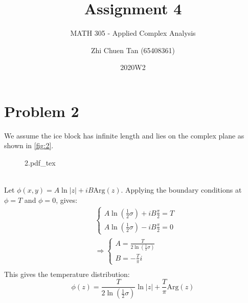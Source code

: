 \documentclass[a4paper, titlepage, DIV=14]{scrartcl}
\title{Assignment 4}
\subtitle{MATH 305 - Applied Complex Analysis}
\author{Zhi Chuen Tan (65408361)}
\date{2020W2}
\newcommand{\incfig}[1]{%
    \def\svgwidth{0.75\columnwidth}
    {#1.pdf_tex}
}
\newcommand{\Arg}{\text{Arg}}
\begin{document}
    \onehalfspacing
    \hypersetup{pageanchor=false}
    \begin{titlepage}
        \maketitle
        \vfill
        
    \end{titlepage}
    \hypersetup{pageanchor=true}


    \section*{Problem 2}
    We assume the ice block has infinite length and lies on the complex plane as shown in \autoref{fig:2}.
    \begin{figure}[!h]
        \centering
        \incfig{2}
        \caption{}
        \label{fig:2}
    \end{figure} \\
    Let $\phi(x,y) = A\ln|z| + iB\Arg(z)$. Applying the 
    boundary conditions at $\phi=T$ and $\phi=0$, gives:
    \begin{align*}
        &\begin{cases}
            A\ln(\frac{1}{2}\sigma) + iB\frac{\pi}{2} = T \\
            A\ln(\frac{1}{2}\sigma) - iB\frac{\pi}{2} = 0
        \end{cases} \\
        &\Rightarrow
        \begin{cases}
            A = \frac{T}{2\ln(\frac{1}{2}\sigma)} \\
            B = -\frac{T}{\pi}i
        \end{cases} \\
    \end{align*}
    This gives the temperature distribution:
    \begin{equation*}
        \phi(z) = \frac{T}{2\ln(\frac{1}{2}\sigma)}\ln|z| + \frac{T}{\pi}\Arg(z)
    \end{equation*}
\end{document}
